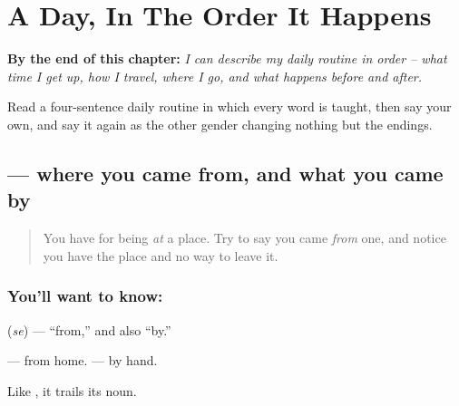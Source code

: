 
\chapter{A Day, In The Order It Happens}
\label{ch:hi-dincharya}

\begin{chapteropening}
\textbf{By the end of this chapter:} \emph{I can describe my daily routine in order -- what time I get up, how I travel, where I go, and what happens before and after.}

Read a four-sentence daily routine in which every word is taught, then say your own, and say it again as the other gender changing nothing but the endings.
\end{chapteropening}

\section[\texorpdfstring{\hi{से} (se)}{से (se)}]{ — where you came from, and what you came by}

\label{lesson:HI-C90-se}



\begin{quote}
You have \textbf{} for being \emph{at} a place. Try to say you came \emph{from} one, and notice you have the place and no way to leave it.
\end{quote}

\subsection*{You'll want to know: }
\textbf{} (\emph{se}) — \textquotedblleft{}from,\textquotedblright{} and also \textquotedblleft{}by.\textquotedblright{}

\textbf{ } — from home. \textbf{ } — by hand.

Like \textbf{}, it trails its noun.

